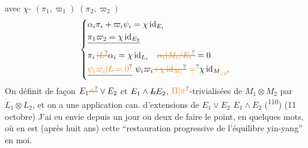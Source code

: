 avec $\chi$- $(\pi_1,\varpi_1)\;(\pi_2,\varpi_2)$
\[
\left\{\begin{aligned}
&\alpha_i\pi_i+\varpi_i\psi_i=\chi\,\mathrm{id}_{E_i}\\
&\deleted{\pi_1\varpi_2=\chi\,\mathrm{id}_{E_2}}\\
&\pi_i\,\deleted{\unsure{\vert L}}\alpha_i=\chi\,\mathrm{id}_{L_i}\quad
 \deleted{\unsure{\alpha_i\vert M_i/E_i}}=0\\
&\deleted{\unsure{\psi_i\varpi_i\vert L=0}}\ \psi_i\varpi_i
 \deleted{\unsure{+\chi\,\mathrm{id}_{M_i}}}\ \unsure{=}\chi\,\mathrm{id}_{M_{\unsure{i|2}}}
\end{aligned}\right.
\]
On définit de façon  $E_1\deleted{\unsure{\wedge}}\vee E_2$ et $E_1\wedge\deleted{L}E_2$,  $\unsure{\Pi|\pi}$-trivialisées de $M_1\otimes M_2$ par $L_1\otimes L_2$, et on a une application can. d'extensions de $E_1\vee E_2$  $E_1\wedge E_2$
(\textsuperscript{110}) (11 octobre) J'ai eu envie depuis un jour ou deux de faire le point, en quelques mots, où en est (après huit ans) cette ``restauration progressive de l'équilibre yin-yang'' en moi.

